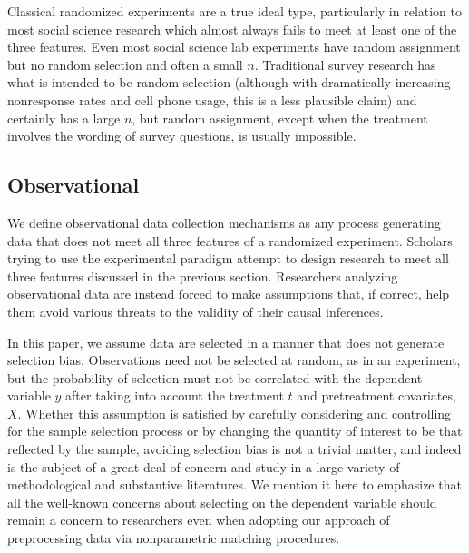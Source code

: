 \documentclass[11pt,titlepage]{article}
\begin{document}
Classical randomized experiments are a true ideal type, particularly
in relation to most social science research which almost always fails
to meet at least one of the three features.  Even most social science
lab experiments have random assignment but no random selection and
often a small $n$.  Traditional survey research has what is intended
to be random selection (although with dramatically increasing
nonresponse rates and cell phone usage, this is a less plausible
claim) and certainly has a large $n$, but random assignment, except
when the treatment involves the wording of survey questions, is
usually impossible.

\subsection{Observational}

We define observational data collection mechanisms as any process
generating data that does not meet all three features of a randomized
experiment.  Scholars trying to use the experimental paradigm attempt
to design research to meet all three features discussed in the
previous section.  Researchers analyzing observational data are
instead forced to make assumptions that, if correct, help them avoid
various threats to the validity of their causal inferences.

In this paper, we assume data are selected in a manner that does not
generate selection bias.  Observations need not be selected at random,
as in an experiment, but the probability of selection must not be
correlated with the dependent variable $y$ after taking into account
the treatment $t$ and pretreatment covariates, $X$.  Whether this
assumption is satisfied by carefully considering and controlling for
the sample selection process or by changing the quantity of interest
to be that reflected by the sample, avoiding selection bias is not a
trivial matter, and indeed is the subject of a great deal of concern
and study in a large variety of methodological and substantive
literatures.  We mention it here to emphasize that all the well-known
concerns about selecting on the dependent variable should remain a
concern to researchers even when adopting our approach of
preprocessing data via nonparametric matching procedures.
\end{document}

